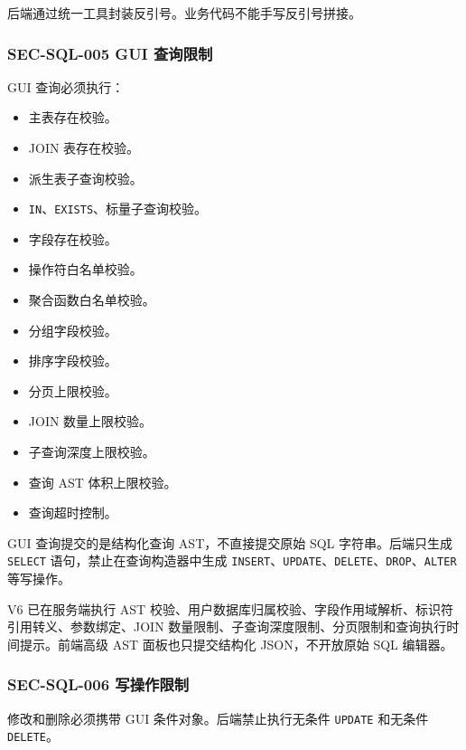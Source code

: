 \documentclass[
  a4paper,
  UTF8]{ctexart}
\providecommand{\tightlist}{%
  \setlength{\itemsep}{0pt}\setlength{\parskip}{0pt}}
\begin{document}
后端通过统一工具封装反引号。业务代码不能手写反引号拼接。

\hypertarget{sec-sql-005-gui-ux67e5ux8be2ux9650ux5236}{%
\subsubsection{SEC-SQL-005 GUI
查询限制}\label{sec-sql-005-gui-ux67e5ux8be2ux9650ux5236}}

GUI 查询必须执行：

\begin{itemize}
\tightlist
\item
  主表存在校验。
\item
  JOIN 表存在校验。
\item
  派生表子查询校验。
\item
  \texttt{IN}、\texttt{EXISTS}、标量子查询校验。
\item
  字段存在校验。
\item
  操作符白名单校验。
\item
  聚合函数白名单校验。
\item
  分组字段校验。
\item
  排序字段校验。
\item
  分页上限校验。
\item
  JOIN 数量上限校验。
\item
  子查询深度上限校验。
\item
  查询 AST 体积上限校验。
\item
  查询超时控制。
\end{itemize}

GUI 查询提交的是结构化查询 AST，不直接提交原始 SQL 字符串。后端只生成
\texttt{SELECT} 语句，禁止在查询构造器中生成
\texttt{INSERT}、\texttt{UPDATE}、\texttt{DELETE}、\texttt{DROP}、\texttt{ALTER}
等写操作。

V6 已在服务端执行 AST
校验、用户数据库归属校验、字段作用域解析、标识符引用转义、参数绑定、JOIN
数量限制、子查询深度限制、分页限制和查询执行时间提示。前端高级 AST
面板也只提交结构化 JSON，不开放原始 SQL 编辑器。

\hypertarget{sec-sql-006-ux5199ux64cdux4f5cux9650ux5236}{%
\subsubsection{SEC-SQL-006
写操作限制}\label{sec-sql-006-ux5199ux64cdux4f5cux9650ux5236}}

修改和删除必须携带 GUI 条件对象。后端禁止执行无条件 \texttt{UPDATE}
和无条件 \texttt{DELETE}。
\end{document}
